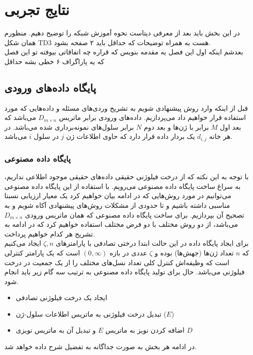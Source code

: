 
\chapter{نتایج تجربی}
در این بخش باید بعد از معرفی دیتاست نحوه آموزش شبکه را توضیح دهیم. منظورم همان شکل TD3 هست به همراه توضیحات که حداقل باید ۲ صفحه بشود.
\\
بعدشم اینکه اول این فصل یه مقدمه بنویس که قراره چه اتفاقاتی بیوفته تو این فصل که یه پاراگراف ۶ خطی بشه حداقل

\section{پایگاه داده‌های ورودی}
قبل از اینکه وارد روش پیشنهادی شویم به تشریح وردی‌های مسئله و داده‌هایی که مورد استفاده قرار خواهیم داد می‌پردازیم.
داده‌های ورودی برابر ماتریس $D_{m\times n}$ می‌باشد که بعد اول $M$ برابر با ژن‌ها و بعد دوم $N$ برابر سلول‌های نمونه‌برداری شده می‌باشد. در هر خانه $d_{i,j}$ یک بردار داده قرار دارد که حاوی اطلاعات ژن $j$ در سلول $i$ می‌باشد.

\subsection[پایگاه داده مصنوعی]
{پایگاه داده مصنوعی
}

با توجه به این نکته که از درخت فیلوژنی حقیقی داده‌های حقیقی موجود اطلاعی نداریم، به سراغ ساخت پایگاه‌ داده مصنوعی می‌رویم. با استفاده از این پایگاه داده مصنوعی می‌توانیم در مورد روش‌هایی که در ادامه بیان خواهیم کرد یک معیار ارزیابی نسبتا مناسبی داشته باشیم و تا حدودی از مشکلات روش‌های پیشنهادی آکاه شویم و به تصحیح آن بپردازیم. برای ساخت پایگاه داده مصنوعی که همان ماتریس ورودی $D_{m\times n}$ می‌باشد، از دو روش مختلف با دو فرض مختلف استفاده خواهیم کرد که در ادامه به تشریح هر کدام خواهیم پرداخت.
\\
برای ایجاد پایگاه داده در این حالت ابتدا درختی تصادفی با پارامترهای $\zeta, n$ ایجاد می‌کنیم که $n$ تعداد ژن‌ها (جهش‌ها) بوده و $\zeta$ عددی در بازه $(0, \infty)$ است که یک پارامتر کنترلی است که وظیفه‌اش کنترل کلی تعداد نسل‌های مختلف را از یک جمعیت در درخت فیلوژنی می‌باشد.
حال برای تولید پایگاه داده مصنوعی به ترتیب سه گام زیر باید انجام شود.
\begin{itemize}
	\item ایجاد یک درخت فیلوژنی تصادفی
	\item تبدیل درخت فیلوژنی به ماتریس اطلاعات سلول-ژن ($E$)
	\item اضافه کردن نویز به ماتریس $E$ و تبدیل آن به ماتریس نویزی $D$
\end{itemize}
در ادامه هر بخش به صورت جداگانه به تفضیل شرح داده خواهد شد.

